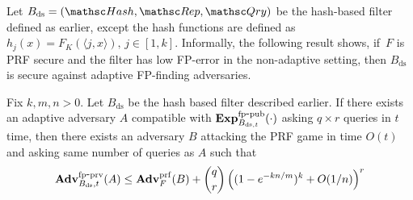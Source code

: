 \newcommand{\FK}{F_K(\langle j,x \rangle)}
\newcommand{\rhoK}{\rho(\langle j,x \rangle)}

Let $B_{\mathrm{ds}}=(\Hash,\Rep,\Qry)$ be the hash-based filter defined as earlier, except the hash functions are defined as $h_j(x) = \FK, \, j \in [1,k]$. Informally, the following result shows, if~$F$ is PRF secure and the filter has low FP-error in the non-adaptive setting, then $B_{\mathrm{ds}}$ is secure against adaptive FP-finding adversaries.


\begin{theorem}\label{thm2}
Fix $k,m,n >0$. Let $B_{\mathrm{ds}}$ be the hash based filter described earlier. If there exists an adaptive adversary $A$ compatible with $\mathrm{\mathbf{Exp}}^{\mathrm{fp\mbox{-}pub}}_{B_{\mathrm{ds},t}}(\cdot)$ asking $q \times r$ queries in $t$ time, then there exists an adversary $B$ attacking the PRF game in time $O(t)$ and asking same number of queries as $A$ such that 
\begin{equation}
\mathrm{\mathbf{Adv}}^{\mathrm{fp\mbox{-}prv}}_{B_\mathrm{ds},t}(A)\leq  \mathbf{Adv}^{\mathrm{prf}}_{F}(B)  + {\dbinom{q}{r}} \left( (1-e^{-kn/m})^k + O(1/n) \right)^r
\end{equation}
\end{theorem}

